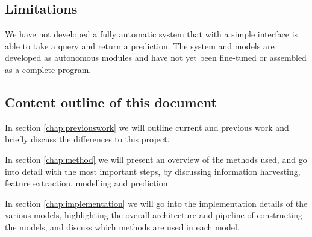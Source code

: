 \documentclass[10pt,letterpaper,final]{article}
\begin{document}





\subsection{Limitations}
We have not developed a fully automatic system that with a simple
interface is able to take a query and return a prediction. The system
and models are developed as autonomous modules and have not yet been
fine-tuned or assembled as a complete program.


\subsection{Content outline of this document}
In section \ref{chap:previouswork} we will outline current and previous
work and briefly discuss the differences to this project.

In section \ref{chap:method} we will present an overview of the methods
used, and go into detail with the most important steps, by discussing
information harvesting, feature extraction, modelling and prediction.


In section \ref{chap:implementation} we will go into the implementation
details of the various models, highlighting the overall architecture and
pipeline of constructing the models, and discuss which methods are used
in each model.
\end{document}
